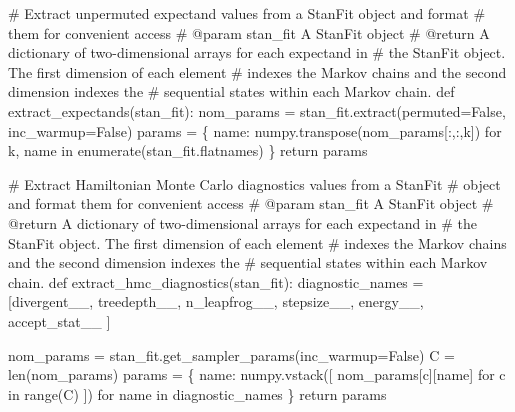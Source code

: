 \documentclass[
  letterpaper,
  DIV=11,
  numbers=noendperiod]{scrartcl}
\newenvironment{Shaded}{\begin{snugshade}}{\end{snugshade}}
\newcommand{\BuiltInTok}[1]{\textcolor[rgb]{0.00,0.23,0.31}{#1}}
\newcommand{\CommentTok}[1]{\textcolor[rgb]{0.37,0.37,0.37}{#1}}
\newcommand{\ControlFlowTok}[1]{\textcolor[rgb]{0.00,0.23,0.31}{#1}}
\newcommand{\KeywordTok}[1]{\textcolor[rgb]{0.00,0.23,0.31}{#1}}
\newcommand{\NormalTok}[1]{\textcolor[rgb]{0.00,0.23,0.31}{#1}}
\newcommand{\OperatorTok}[1]{\textcolor[rgb]{0.37,0.37,0.37}{#1}}
\newcommand{\StringTok}[1]{\textcolor[rgb]{0.13,0.47,0.30}{#1}}
\newcommand{\VariableTok}[1]{\textcolor[rgb]{0.07,0.07,0.07}{#1}}
\begin{document}
\begin{Shaded}
\begin{Highlighting}[]
\CommentTok{\# Extract unpermuted expectand values from a StanFit object and format }
\CommentTok{\# them for convenient access}
\CommentTok{\# @param stan\_fit A StanFit object}
\CommentTok{\# @return A dictionary of two{-}dimensional arrays for each expectand in }
\CommentTok{\#         the StanFit object.  The first dimension of each element }
\CommentTok{\#         indexes the Markov chains and the second dimension indexes the }
\CommentTok{\#         sequential states within each Markov chain. }
\KeywordTok{def}\NormalTok{ extract\_expectands(stan\_fit):}
\NormalTok{  nom\_params }\OperatorTok{=}\NormalTok{ stan\_fit.extract(permuted}\OperatorTok{=}\VariableTok{False}\NormalTok{, inc\_warmup}\OperatorTok{=}\VariableTok{False}\NormalTok{)}
\NormalTok{  params }\OperatorTok{=}\NormalTok{ \{ name: numpy.transpose(nom\_params[:,:,k]) }
             \ControlFlowTok{for}\NormalTok{ k, name }\KeywordTok{in} \BuiltInTok{enumerate}\NormalTok{(stan\_fit.flatnames) \}}
  \ControlFlowTok{return}\NormalTok{ params}

\CommentTok{\# Extract Hamiltonian Monte Carlo diagnostics values from a StanFit}
\CommentTok{\# object and format them for convenient access}
\CommentTok{\# @param stan\_fit A StanFit object}
\CommentTok{\# @return A dictionary of two{-}dimensional arrays for each expectand in }
\CommentTok{\#         the StanFit object.  The first dimension of each element }
\CommentTok{\#         indexes the Markov chains and the second dimension indexes the }
\CommentTok{\#         sequential states within each Markov chain. }
\KeywordTok{def}\NormalTok{ extract\_hmc\_diagnostics(stan\_fit):}
\NormalTok{  diagnostic\_names }\OperatorTok{=}\NormalTok{ [}\StringTok{\textquotesingle{}divergent\_\_\textquotesingle{}}\NormalTok{, }\StringTok{\textquotesingle{}treedepth\_\_\textquotesingle{}}\NormalTok{, }\StringTok{\textquotesingle{}n\_leapfrog\_\_\textquotesingle{}}\NormalTok{, }
                      \StringTok{\textquotesingle{}stepsize\_\_\textquotesingle{}}\NormalTok{, }\StringTok{\textquotesingle{}energy\_\_\textquotesingle{}}\NormalTok{, }\StringTok{\textquotesingle{}accept\_stat\_\_\textquotesingle{}}\NormalTok{ ]}
  
\NormalTok{  nom\_params }\OperatorTok{=}\NormalTok{ stan\_fit.get\_sampler\_params(inc\_warmup}\OperatorTok{=}\VariableTok{False}\NormalTok{)}
\NormalTok{  C }\OperatorTok{=} \BuiltInTok{len}\NormalTok{(nom\_params)}
\NormalTok{  params }\OperatorTok{=}\NormalTok{ \{ name: numpy.vstack([ nom\_params[c][name] }
                                  \ControlFlowTok{for}\NormalTok{ c }\KeywordTok{in} \BuiltInTok{range}\NormalTok{(C) ])}
           \ControlFlowTok{for}\NormalTok{ name }\KeywordTok{in}\NormalTok{ diagnostic\_names \}}
  \ControlFlowTok{return}\NormalTok{ params}
\end{Highlighting}
\end{Shaded}
\end{document}
